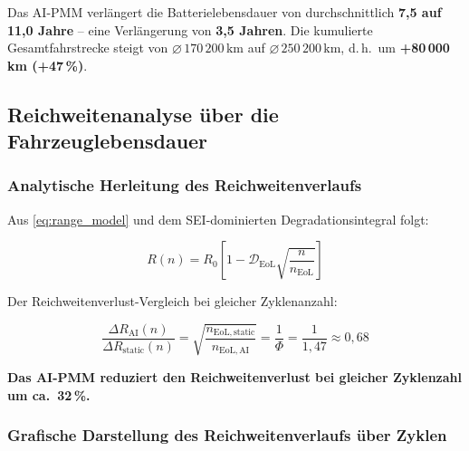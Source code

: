 ﻿\documentclass[12pt,a4paper]{article}
\begin{document}
	Das AI-PMM verlängert die Batterielebensdauer von durchschnittlich
	\textbf{7{,}5 auf 11{,}0 Jahre} -- eine Verlängerung von \textbf{3{,}5 Jahren}.
	Die kumulierte Gesamtfahrstrecke steigt von $\varnothing\,170\,200\,\mathrm{km}$
	auf $\varnothing\,250\,200\,\mathrm{km}$, d.\,h.\ um \textbf{+80\,000\,km (+47\,\%)}.
	
	\subsection{Reichweitenanalyse über die Fahrzeuglebensdauer}
	
	\subsubsection{Analytische Herleitung des Reichweitenverlaufs}
	
	Aus \eqref{eq:range_model} und dem SEI-dominierten Degradationsintegral
	folgt:
	
	\begin{equation}
		R(n) = R_0 \left[1 - \mathcal{D}_\mathrm{EoL}\sqrt{\frac{n}{n_\mathrm{EoL}}}\right]
		\label{eq:range_vs_cycles}
	\end{equation}
	
	Der Reichweitenverlust-Vergleich bei gleicher Zyklenanzahl:
	
	\begin{equation}
		\frac{\Delta R_\mathrm{AI}(n)}{\Delta R_\mathrm{static}(n)} =
		\sqrt{\frac{n_\mathrm{EoL,static}}{n_\mathrm{EoL,AI}}} =
		\frac{1}{\Phi} = \frac{1}{1{,}47} \approx 0{,}68
		\label{eq:range_loss_ratio}
	\end{equation}
	
	\textbf{Das AI-PMM reduziert den Reichweitenverlust bei gleicher Zyklenzahl
		um ca.\ 32\,\%.}
	
	\subsubsection{Grafische Darstellung des Reichweitenverlaufs über Zyklen}
	
\end{document}
